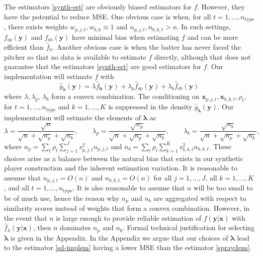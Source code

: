 \documentclass[12pt]{article}
\newcommand{\y}{\textbf{y}}
\newcommand{\x}{\textbf{x}}
\newcommand{\h}{\textbf{h}}
\newcommand{\lambdabf}{\boldsymbol{\lambda}}
\begin{document}
The estimators \eqref{synth-est} are obviously biased estimators for $f$. However, they have the potential to reduce MSE. One obvious case is when, for all 
$t = 1,\ldots,n_{\text{type}}$, there exists weights 
$w_{p,j,t}, w_{b,k} \approx 1$ and 
$n_{p,j,t}, n_{b,k,t} > n$. 
In such settings, $f_{\text{sp}}(\y)$ and $f_{\text{sb}}(\y)$ have minimal bias when estimating $f$ and can be more efficient than $\hat f_h$. Another obvious case is when the batter has never faced the pitcher so that no data is available to estimate $f$ directly, although that does not guarantee that the estimators \eqref{synth-est} are good estimators for $f$. Our implementation will estimate $f$ with
\begin{equation} \label{sd-implem}
  \hat{g}_{\lambdabf}(\y) = \lambda \hat f_\h(\y) 
    + \lambda_p \hat f_{\text{sp}}(\y) 
    + \lambda_b \hat f_{\text{sb}}(\y)
\end{equation}
where $\lambda,\lambda_p$, $\lambda_b$ form a convex combination. The conditioning on $\x_{p,j,t}, \x_{b,k,t}, \rho_t$, for $t = 1,\ldots,n_{\text{type}}$ and $k = 1,\ldots,K$ is suppressed in the density $\hat{g}_{\lambdabf}(\y)$.
Our implementation will estimate the elements of $\lambdabf$ as 
$$
  \lambda = \frac{\sqrt{n}}{\sqrt{n} + \sqrt{n_p} + \sqrt{n_b}}, \qquad
  \lambda_p = \frac{\sqrt{n_p}}{\sqrt{n} + \sqrt{n_p} + \sqrt{n_b}}, \qquad
  \lambda_b = \frac{\sqrt{n_b}}{\sqrt{n} + \sqrt{n_p} + \sqrt{n_b}},
$$
where $n_p = \sum_t\rho_t\sum_{j=1}^J s_{p,j,t}^2n_{p,j,t}$ and 
$n_b = \sum_t\rho_t\sum_{k=1}^K s_{b,k,t}^2n_{b,k,t}$.  These choices arise as a balance between the natural bias that exists in our synthetic player construction and the inherent estimation variation. %
It is reasonable to assume that $n_{p,j,t} = O(n)$ and $n_{b,k,t} = O(n)$ for all $j = 1,\ldots,J$, all $k = 1,\ldots,K$, and all $t = 1,\ldots,n_{\text{type}}$. It is also reasonable to assume that $n$ will be too small to be of much use, hence the reason why $n_p$ and $n_b$ are aggregated with respect to similarity scores instead of weights that form a convex combination. However, in the event that $n$ is large enough to provide reliable estimation of $f(\y|\x)$ with $\hat f_h(\y|\x)$, then $n$ dominates $n_p$ and $n_b$. Formal technical justification for selecting $\lambdabf$ is given in the Appendix. In the Appendix we argue that our choices of $\lambdabf$ lead to the estimator \eqref{sd-implem} having a lower MSE than the estimator \eqref{spraydens}.
\end{document}
